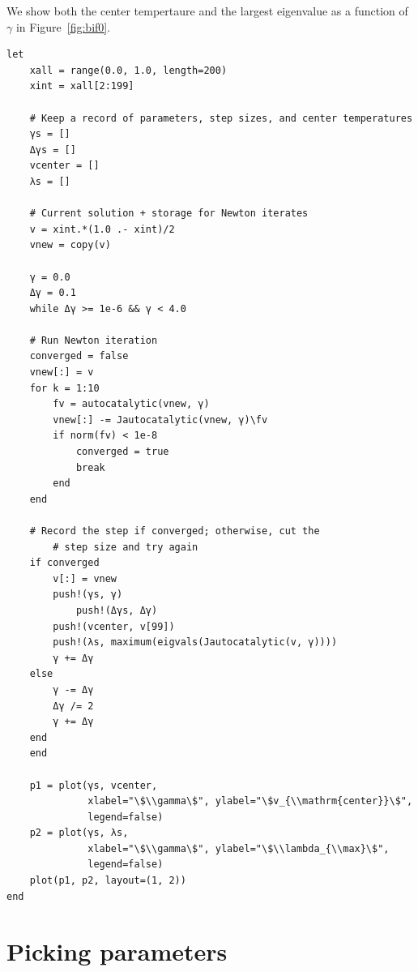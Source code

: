 \documentclass[12pt, leqno]{article} %
\begin{document}
We show both the center tempertaure and the largest eigenvalue as a
function of $\gamma$ in Figure~\ref{fig:bif0}.

\begin{verbatim}
let
    xall = range(0.0, 1.0, length=200)
    xint = xall[2:199]
    
    # Keep a record of parameters, step sizes, and center temperatures
    γs = []
    Δγs = []
    vcenter = []
    λs = []
    
    # Current solution + storage for Newton iterates
    v = xint.*(1.0 .- xint)/2
    vnew = copy(v)
    
    γ = 0.0
    Δγ = 0.1
    while Δγ >= 1e-6 && γ < 4.0
        
	# Run Newton iteration
	converged = false
	vnew[:] = v
	for k = 1:10
	    fv = autocatalytic(vnew, γ)
	    vnew[:] -= Jautocatalytic(vnew, γ)\fv
	    if norm(fv) < 1e-8
	        converged = true
	        break
	    end
	end
    
	# Record the step if converged; otherwise, cut the
        # step size and try again
	if converged
	    v[:] = vnew
	    push!(γs, γ)
	        push!(Δγs, Δγ)
	    push!(vcenter, v[99])
	    push!(λs, maximum(eigvals(Jautocatalytic(v, γ))))
	    γ += Δγ
	else
	    γ -= Δγ
	    Δγ /= 2
	    γ += Δγ
	end
    end

    p1 = plot(γs, vcenter,
              xlabel="\$\\gamma\$", ylabel="\$v_{\\mathrm{center}}\$",
              legend=false)
    p2 = plot(γs, λs,
              xlabel="\$\\gamma\$", ylabel="\$\\lambda_{\\max}\$",
              legend=false)
    plot(p1, p2, layout=(1, 2))
end
\end{verbatim}

\section{Picking parameters}
\end{document}
